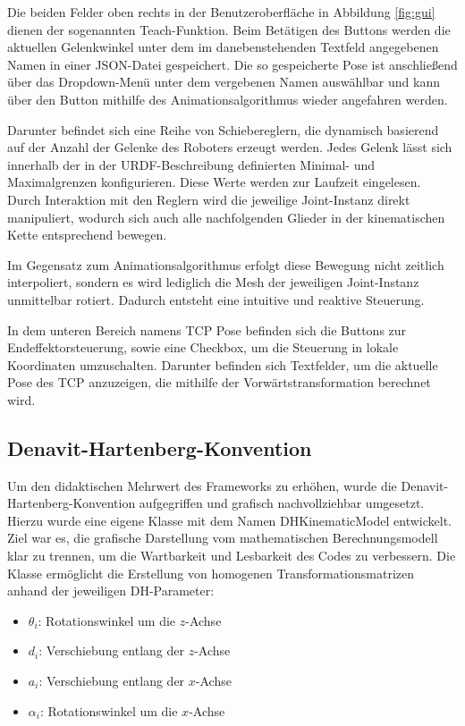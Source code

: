 Die beiden Felder oben rechts in der Benutzeroberfläche in Abbildung \ref{fig:gui} dienen der sogenannten Teach-Funktion.
Beim Betätigen des Buttons  werden die aktuellen Gelenkwinkel unter dem im danebenstehenden Textfeld angegebenen Namen in einer JSON-Datei gespeichert.
Die so gespeicherte Pose ist anschließend über das Dropdown-Menü unter dem vergebenen Namen auswählbar und kann über den Button  mithilfe des Animationsalgorithmus wieder angefahren werden.

Darunter befindet sich eine Reihe von Schiebereglern, die dynamisch basierend auf der Anzahl der Gelenke des Roboters erzeugt werden.
Jedes Gelenk lässt sich innerhalb der in der URDF-Beschreibung definierten Minimal- und Maximalgrenzen konfigurieren. Diese Werte werden zur Laufzeit eingelesen.
Durch Interaktion mit den Reglern wird die jeweilige Joint-Instanz direkt manipuliert, wodurch sich auch alle nachfolgenden Glieder in der kinematischen Kette entsprechend bewegen.

Im Gegensatz zum Animationsalgorithmus erfolgt diese Bewegung nicht zeitlich interpoliert, sondern es wird lediglich die Mesh der jeweiligen Joint-Instanz unmittelbar rotiert.
Dadurch entsteht eine intuitive und reaktive Steuerung.

In dem unteren Bereich namens TCP Pose befinden sich die Buttons zur Endeffektorsteuerung, sowie eine Checkbox, um die Steuerung in lokale Koordinaten umzuschalten.
Darunter befinden sich Textfelder, um die aktuelle Pose des TCP anzuzeigen, die mithilfe der Vorwärtstransformation berechnet wird.



\subsection{Denavit-Hartenberg-Konvention}
Um den didaktischen Mehrwert des Frameworks zu erhöhen, wurde die Denavit-Har\-ten\-berg-Konvention aufgegriffen und grafisch nachvollziehbar umgesetzt.
Hierzu wurde eine eigene Klasse mit dem Namen DHKinematicModel entwickelt. Ziel war es, die grafische Darstellung vom mathematischen Berechnungsmodell klar zu trennen,
um die Wartbarkeit und Lesbarkeit des Codes zu verbessern.
Die Klasse ermöglicht die Erstellung von homogenen Transformationsmatrizen anhand der jeweiligen DH-Parameter:
\begin{itemize}
    \item \( \theta_i \): Rotationswinkel um die \( z \)-Achse
    \item \( d_i \): Verschiebung entlang der \( z \)-Achse
    \item \( a_i \): Verschiebung entlang der \( x \)-Achse
    \item \( \alpha_i \): Rotationswinkel um die \( x \)-Achse
\end{itemize}

